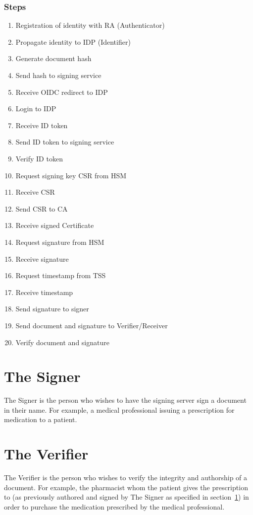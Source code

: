 \subsubsection{Steps}
\begin{enumerate}
	\item Registration of identity with RA (Authenticator)
	\item Propagate identity to IDP (Identifier)
	\item Generate document hash
	\item Send hash to signing service
	\item Receive OIDC redirect to IDP
	\item Login to IDP
	\item Receive ID token
	\item Send ID token to signing service
	\item Verify ID token
	\item Request signing key CSR from HSM
	\item Receive CSR
	\item Send CSR to CA
	\item Receive signed Certificate
	\item Request signature from HSM
	\item Receive signature
	\item Request timestamp from TSS
	\item Receive timestamp
	\item Send signature to signer
	\item Send document and signature to Verifier/Receiver
	\item Verify document and signature
\end{enumerate}


\section{The Signer}
\label{sec:actorsigner}
The Signer is the person who wishes to have the signing server sign a document in their name.
For example, a medical professional issuing a prescription for medication to a patient.

\section{The Verifier}
\label{sec:actorverifier}
The Verifier is the person who wishes to verify the integrity and authorship of a document.
For example, the pharmacist whom the patient gives the prescription to (as previously authored and signed by The Signer as specified in section~\ref{sec:actorsigner}) in order to purchase the medication prescribed by the medical professional.

